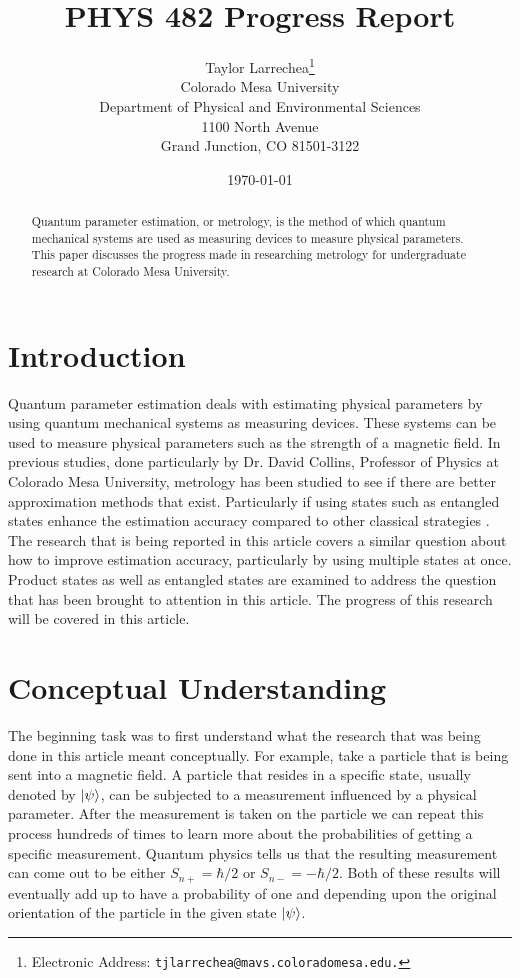 \documentclass[twocolumn]{article}
\title{\textbf{PHYS 482 Progress Report}}
\author{Taylor Larrechea\footnote{Electronic Address: \texttt{tjlarrechea@mavs.coloradomesa.edu.}} \\
    Colorado Mesa University \\
    Department of Physical and Environmental Sciences \\
    1100 North Avenue \\
    Grand Junction, CO 81501-3122}
\date{\today}
\begin{document}
\maketitle
\begin{abstract}
Quantum parameter estimation, or metrology, is the method of which quantum mechanical systems are used as measuring devices to measure physical parameters. This paper discusses the progress made in researching metrology for undergraduate research at Colorado Mesa University.
\end{abstract}
\section*{Introduction}
Quantum parameter estimation deals with estimating physical parameters by using quantum mechanical systems as measuring devices. These systems can be used to measure physical parameters such as the strength of a magnetic field. In previous studies, done particularly by Dr. David Collins, Professor of Physics at Colorado Mesa University, metrology has been studied to see if there are better approximation methods that exist. Particularly if using states such as entangled states enhance the estimation accuracy compared to other classical strategies \cite{D. Collins}. The research that is being reported in this article covers a similar question about how to improve estimation accuracy, particularly by using multiple states at once. Product states as well as entangled states are examined to address the question that has been brought to attention in this article. The progress of this research will be covered in this article.
\section*{Conceptual Understanding}
The beginning task was to first understand what the research that was being done in this article meant conceptually. For example, take a particle that is being sent into a magnetic field. A particle that resides in a specific state, usually denoted by $\ket{\psi}$, can be subjected to a measurement influenced by a physical parameter. After the measurement is taken on the particle we can repeat this process hundreds of times to learn more about the probabilities of getting a specific measurement. Quantum physics tells us that the resulting measurement can come out to be either $S_{n+}=\hbar/2$ or $S_{n-}=-\hbar/2$. Both of these results will eventually add up to have a probability of one and depending upon the original orientation of the particle in the given state $\ket{\psi}$.
\end{document}
